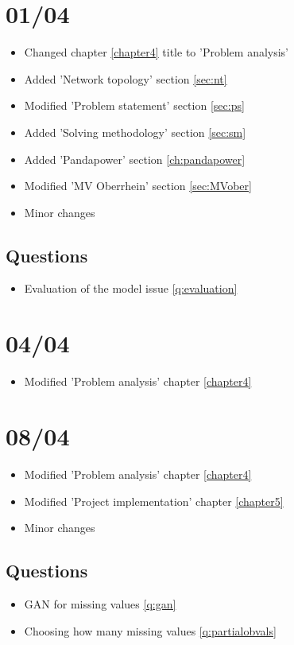 \section{01/04}
\begin{itemize}
    \item Changed chapter \ref{chapter4} title to 'Problem analysis'
    \item Added 'Network topology' section \ref{sec:nt}
    \item Modified 'Problem statement' section \ref{sec:ps}
    \item Added 'Solving methodology' section \ref{sec:sm}
    \item Added 'Pandapower' section \ref{ch:pandapower}
    \item Modified 'MV Oberrhein' section \ref{sec:MVober}
    \item Minor changes
\end{itemize}

\subsection{Questions}
\begin{itemize}
    \item Evaluation of the model issue \ref{q:evaluation}
\end{itemize}

\section{04/04}
\begin{itemize}
    \item Modified 'Problem analysis' chapter \ref{chapter4}
\end{itemize}

\section{08/04}
\begin{itemize}
    \item Modified 'Problem analysis' chapter \ref{chapter4}
    \item Modified 'Project implementation' chapter \ref{chapter5}
    \item Minor changes
\end{itemize}

\subsection{Questions}
\begin{itemize}
    \item \gls{GAN} for missing values \ref{q:gan}
    \item Choosing how many missing values \ref{q:partialobvals}
\end{itemize}
